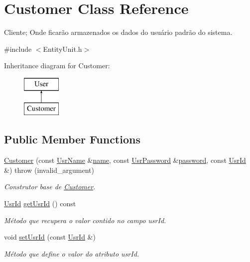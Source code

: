 \hypertarget{classCustomer}{\section{Customer Class Reference}
\label{d9/d12/classCustomer}
}


Cliente; Onde ficarão armazenados os dados do usuário padrão do sistema.  




{\ttfamily \#include $<$Entity\-Unit.\-h$>$}

Inheritance diagram for Customer\-:\begin{figure}[H]
\begin{center}
\leavevmode
\includegraphics[height=2.000000cm]{d9/d12/classCustomer}
\end{center}
\end{figure}
\subsection*{Public Member Functions}
\begin{DoxyCompactItemize}
\item 
\hyperlink{classCustomer_aeef5b5cf9de00a37f6db9d58bff82bf8}{Customer} (const \hyperlink{classUsrName}{Usr\-Name} \&\hyperlink{classUser_a578e38a0fc23375ce19d689f96c6abaa}{name}, const \hyperlink{classUsrPassword}{Usr\-Password} \&\hyperlink{classUser_a84c5ed822199a90e753ebfc54262fde8}{password}, const \hyperlink{classUsrId}{Usr\-Id} \&)  throw (invalid\-\_\-argument)
\begin{DoxyCompactList}\small\item\em Construtor base de \hyperlink{classCustomer}{Customer}. \end{DoxyCompactList}\item 
\hyperlink{classUsrId}{Usr\-Id} \hyperlink{classCustomer_a76d325591ef27599cb1d7f3e4b77b8d4}{get\-Usr\-Id} () const 
\begin{DoxyCompactList}\small\item\em Método que recupera o valor contido no campo usr\-Id. \end{DoxyCompactList}\item 
void \hyperlink{classCustomer_a89b74269a4750193d61b305b13df82fa}{set\-Usr\-Id} (const \hyperlink{classUsrId}{Usr\-Id} \&)
\begin{DoxyCompactList}\small\item\em Método que define o valor do atributo usr\-Id. \end{DoxyCompactList}\end{DoxyCompactItemize}
